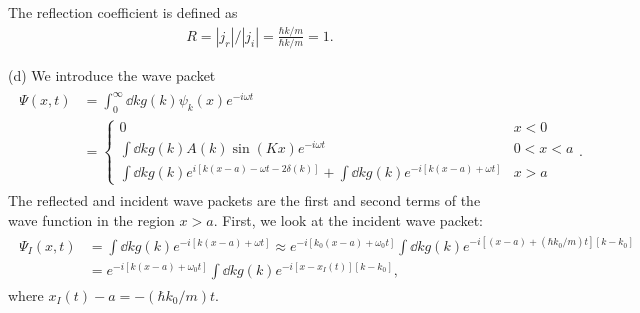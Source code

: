 {The reflection coefficient is defined as
\begin{eqnarray}
    R = |j_{r}|/|j_{i}| = \frac{\hbar k/m}{\hbar k/m} = 1
.\end{eqnarray}

(d) We introduce the wave packet 
\begin{eqnarray}
    \begin{aligned}
        \Psi(x,t) &= \int_{0}^{\infty} \dd{k} g(k) \psi_{k}(x) e^{-i \omega t} \\
                  &= \begin{cases}
                      0 & x < 0 \\
                      \int \dd{k} g(k) A(k) \sin(Kx) e^{-i \omega t} & 0 < x < a \\
                      \int \dd{k} g(k) e^{i[k(x-a) - \omega t - 2\delta(k)]} + \int \dd{k} g(k) e^{-i[k(x-a) + \omega t]} & x > a
                  \end{cases}
    .\end{aligned}
\end{eqnarray}
The reflected and incident wave packets are the first and second terms of the wave function in the region $x > a$.
First, we look at the incident wave packet:
\begin{eqnarray}
    \begin{aligned}
        \Psi_{I}(x,t) &= \int \dd{k} g(k) e^{-i[k(x-a) + \omega t]} \approx e^{-i[k_0(x-a) + \omega_0 t]} \int \dd{k} g(k) e^{-i[(x - a) + (\hbar k_0/m)t][k-k_0]} \\
                      &= e^{-i[k(x-a) + \omega_0 t]} \int \dd{k} g(k) e^{-i[x - x_{I}(t)][k-k_0]}
    ,\end{aligned}
\end{eqnarray}
where $x_{I}(t) - a = - (\hbar k_0/m)t$.

}
